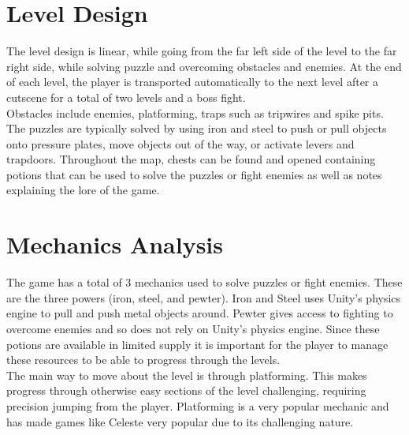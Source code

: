 \documentclass{article}
\begin{document}
\section{Level Design}
The level design is linear, while going from the far left side of the level to the far right side, while solving puzzle and overcoming obstacles and enemies. At the end of each level, the player is transported automatically to the next level after a cutscene for a total of two levels and a boss fight.\\
Obstacles include enemies, platforming, traps such as tripwires and spike pits. The puzzles are typically solved by using iron and steel to push or pull objects onto pressure plates, move objects out of the way, or activate levers and trapdoors. Throughout the map, chests can be found and opened containing potions that can be used to solve the puzzles or fight enemies as well as notes explaining the lore of the game.

\section{Mechanics Analysis}
The game has a total of 3 mechanics used to solve puzzles or fight enemies. These are the three powers (iron, steel, and pewter). Iron and Steel uses Unity's physics engine to pull and push metal objects around. Pewter gives access to fighting to overcome enemies and so does not rely on Unity's physics engine. Since these potions are available in limited supply it is important for the player to manage these resources to be able to progress through the levels.\\

The main way to move about the level is through platforming. This makes progress through otherwise easy sections of the level challenging, requiring precision jumping from the player. Platforming is a very popular mechanic and has made games like Celeste very popular due to its challenging nature.
\end{document}
